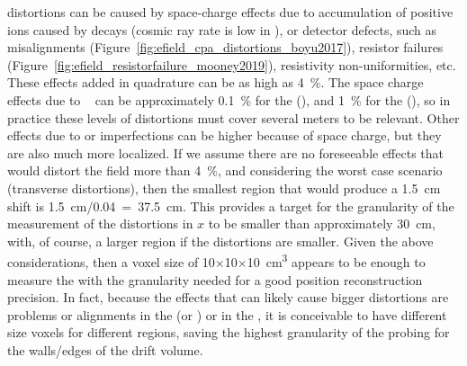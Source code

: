 \efield distortions can be caused by space-charge effects due to accumulation of positive ions caused by  decays (cosmic ray rate is low in ), or detector defects, such as  misalignments (Figure~\ref{fig:efield_cpa_distortions_boyu2017}),  resistor failures (Figure~\ref{fig:efield_resistorfailure_mooney2019}), resistivity non-uniformities, etc.
These effects added in quadrature can be as high as \SI{4}{\%}. 
The space charge effects due to ~\cite{bib:mooney2018} can be approximately \SI{0.1}{\%} for the  (), and \SI{1}{\%} for the  (), so in practice these levels of 
distortions must cover several meters to be relevant.
Other effects due to  or  imperfections can be higher because of space charge, but they are also much more localized. If we assume there are no foreseeable effects that would distort the field more than \SI{4}{\%}, and considering the worst case scenario (transverse distortions), then the smallest region that would produce a \SI{1.5}{\cm} shift is \SI{1.5}{\cm}/\num{0.04}~=~\SI{37.5}{\cm}. This provides a target for the granularity of the measurement of the \efield distortions in $x$ to be smaller than approximately \SI{30}{\cm}, with, of course, a larger region if the distortions are smaller. Given the above considerations, then a voxel size of \num{10}$\times$\num{10}$\times$\SI{10}{\cubic\cm} appears to be enough to measure the \efield with the granularity needed for a good position reconstruction precision. In fact, because the effects that can likely cause bigger \efield distortions are problems or alignments in the  (or ) or in the , it is conceivable to have different size voxels for different regions, saving the highest granularity of the probing for the walls/edges of the drift volume.


\begin{comment}
\begin{dunetable}
[Calibration Requirements]
{p{0.5\textwidth}p{0.15\textwidth}p{0.15\textwidth}}
{tab:calibreq}
{Calibration Specifications and Goals}   
Requirement & Specification & Goal \\ \toprowrule
\efield measurement precision & < 1\% & ALARA \\ \colhline
\efield measurement coverage & > 75\% & AHARA \\ \colhline
\efield measurement granularity & < 30x30x30 cm & ALARA \\ 
\end{dunetable}
\end{comment}

